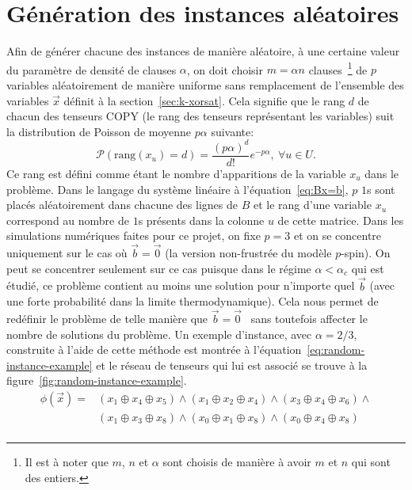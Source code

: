 \section{Génération des instances aléatoires}\label{sec:random-instances}
Afin de générer chacune des instances de manière aléatoire, à une certaine valeur du paramètre de densité de clauses $\alpha$, on doit choisir $m = \alpha n$ clauses~\footnote{Il est à noter que $m$, $n$ et $\alpha$ sont choisis de manière à avoir $m$ et $n$ qui sont des entiers.} de $p$ variables aléatoirement de manière uniforme sans remplacement de l'ensemble des variables $\vec{x}$ définit à la section~\ref{sec:k-xorsat}.
Cela signifie que le rang $d$ de chacun des tenseurs COPY (le rang des tenseurs représentant les variables) suit la distribution de Poisson de moyenne $p\alpha$ suivante: %
\begin{equation}\label{eq:poisson}
    \mathcal{P}(\text{rang}(x_u) = d) = \frac{(p\alpha)^d}{d!} e^{-p\alpha}\mathrm{, }\ \forall u \in U.
\end{equation}
Ce rang est défini comme étant le nombre d'apparitions de la variable $x_u$ dans le problème.
Dans le langage du système linéaire à l'équation~\ref{eq:Bx=b}, $p$ $1$s sont placés aléatoirement dans chacune des lignes de $B$ et le rang d'une variable $x_u$ correspond au nombre de $1$s présents dans la colonne $u$ de cette matrice.
Dans les simulations numériques faites pour ce projet, on fixe $p = 3$ et on se concentre uniquement sur le cas où $\vec{b} = \vec{0}$ (la version non-frustrée du modèle $p$-spin).
On peut se concentrer seulement sur ce cas puisque dans le régime $\alpha < \alpha_c$ qui est étudié, ce problème contient au moins une solution pour n'importe quel $\vec{b}$ (avec une forte probabilité dans la limite thermodynamique).
Cela nous permet de redéfinir le problème de telle manière que $\vec{b} = \vec{0}$~\cite{mezard_alternative_2002, braunstein_complexity_2002} sans toutefois affecter le nombre de solutions du problème.
Un exemple d'instance, avec $\alpha = 2/3$, construite à l'aide de cette méthode est montrée à l'équation~\ref{eq:random-instance-example} et le réseau de tenseurs qui lui est associé se trouve à la figure~\ref{fig:random-instance-example}.
\begin{equation}\label{eq:random-instance-example}
    \begin{split}
        \phi(\vec{x}) = &(x_1 \oplus x_4 \oplus x_5) \wedge (x_1 \oplus x_2 \oplus x_4) \wedge (x_3 \oplus x_4 \oplus x_6) \wedge\\
        &(x_1 \oplus x_3 \oplus x_8) \wedge (x_0 \oplus x_1 \oplus x_8) \wedge (x_0 \oplus x_4 \oplus x_8)\\
    \end{split}
\end{equation}
